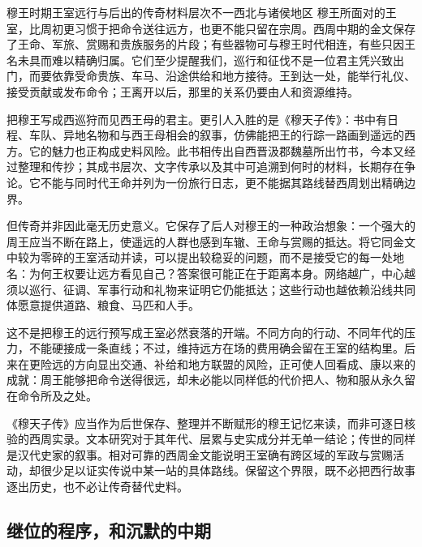 \begin{event}{穆王时期}{王室远行与后出的传奇}{材料层次不一}{西北与诸侯地区}
穆王所面对的王室，比周初更习惯于把命令送往远方，也更不能只留在宗周。西周中期的金文保存了王命、军旅、赏赐和贵族服务的片段；有些器物可与穆王时代相连，有些只因王名未具而难以精确归属。它们至少提醒我们，巡行和征伐不是一位君主凭兴致出门，而要依靠受命贵族、车马、沿途供给和地方接待。王到达一处，能举行礼仪、接受贡献或发布命令；王离开以后，那里的关系仍要由人和资源维持。

把穆王写成西巡狩而见西王母的君主。更引人入胜的是《穆天子传》：书中有日程、车队、异地名物和与西王母相会的叙事，仿佛能把王的行踪一路画到遥远的西方。它的魅力也正构成史料风险。此书相传出自西晋汲郡魏墓所出竹书，今本又经过整理和传抄；其成书层次、文字传承以及其中可追溯到何时的材料，长期存在争论。它不能与同时代王命并列为一份旅行日志，更不能据其路线替西周划出精确边界。

但传奇并非因此毫无历史意义。它保存了后人对穆王的一种政治想象：一个强大的周王应当不断在路上，使遥远的人群也感到车辙、王命与赏赐的抵达。将它同金文中较为零碎的王室活动并读，可以提出较稳妥的问题，而不是接受它的每一处地名：为何王权要让远方看见自己？答案很可能正在于距离本身。网络越广，中心越须以巡行、征调、军事行动和礼物来证明它仍能抵达；这些行动也越依赖沿线共同体愿意提供道路、粮食、马匹和人手。

这不是把穆王的远行预写成王室必然衰落的开端。不同方向的行动、不同年代的压力，不能硬接成一条直线；不过，维持远方在场的费用确会留在王室的结构里。后来在更险远的方向显出交通、补给和地方联盟的风险，正可使人回看成、康以来的成就：周王能够把命令送得很远，却未必能以同样低的代价把人、物和服从永久留在命令所及之处。
\end{event}

\begin{debate}
《穆天子传》应当作为后世保存、整理并不断赋形的穆王记忆来读，而非可逐日核验的西周实录。文本研究对于其年代、层累与史实成分并无单一结论；传世的同样是汉代史家的叙事。相对可靠的西周金文能说明王室确有跨区域的军政与赏赐活动，却很少足以证实传说中某一站的具体路线。保留这个界限，既不必把西行故事逐出历史，也不必让传奇替代史料。
\end{debate}

\subsection{继位的程序，和沉默的中期}

